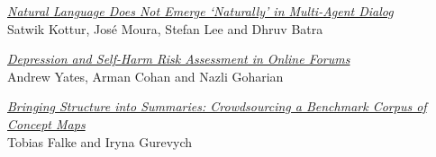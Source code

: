 \hyperlink{page.2945}{\em Natural Language Does Not Emerge ‘Naturally’ in Multi-Agent Dialog}\samepage \\
\hspace*{7mm} Satwik Kottur, Jos\'{e} Moura, Stefan Lee and Dhruv Batra\dotfill {}

\hyperlink{page.2951}{\em Depression and Self-Harm Risk Assessment in Online Forums}\samepage \\
\hspace*{7mm} Andrew Yates, Arman Cohan and Nazli Goharian\dotfill {}

\hyperlink{page.2962}{\em Bringing Structure into Summaries: Crowdsourcing a Benchmark Corpus of Concept Maps}\samepage \\
\hspace*{7mm} Tobias Falke and Iryna Gurevych\dotfill {}

